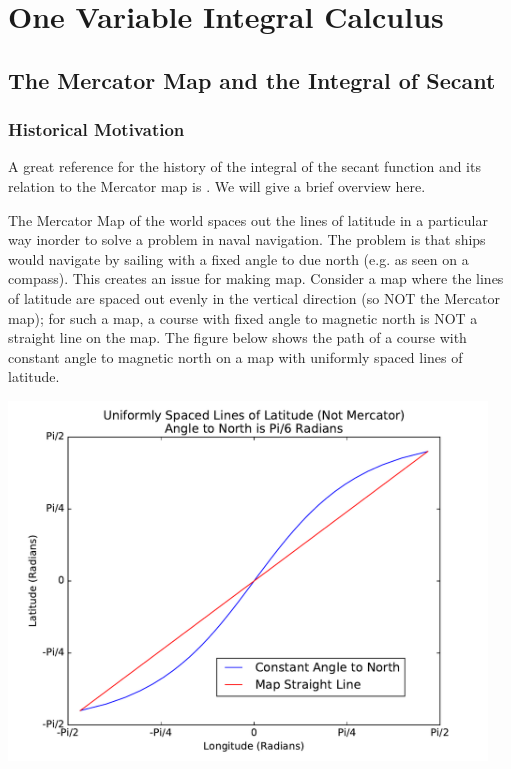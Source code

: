 \section{One Variable Integral Calculus}

\subsection{The Mercator Map and the Integral of Secant}

\subsubsection*{Historical Motivation}

A great reference for the history of the integral of the secant function and its relation to the Mercator map is \cite{mercator}. We will give a brief overview here.

The Mercator Map of the world spaces out the lines of latitude in a particular way inorder to solve a problem in naval navigation. 
The problem is that ships would navigate by sailing with a fixed angle to due north (e.g. as seen on a compass). 
This creates an issue for making map. 
Consider a map where the lines of latitude are spaced out evenly in the vertical direction (so NOT the Mercator map); for such a map, a course with fixed angle to magnetic north is NOT a straight line on the map.  
The figure below shows the path of a course with constant angle to magnetic north on a map with uniformly spaced lines of latitude.

\includegraphics[width = 5in]{oneVarIntCalc/nonMercator.pdf}

